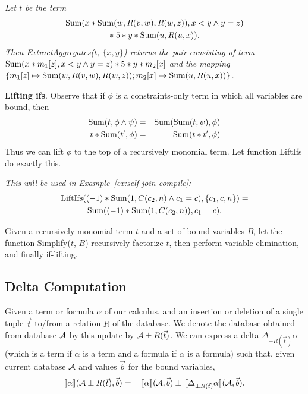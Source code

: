 \begin{example}\em
Let $t$ be the term
\begin{multline*}
\mbox{Sum}(x*\mbox{Sum}(w, R(v, w), R(w, z)), x<y \land y=z) \\
*\; 5 * y * \mbox{Sum}(u, R(u, x)).
\end{multline*}
Then ExtractAggregates($t$, $\{x,y\}$) returns the pair consisting of term
$\mbox{Sum}(x*m_1[z], x<y \land y=z) * 5 * y * m_2[x]$
and the mapping
$\{
m_1[z] \mapsto \mbox{Sum}(w, R(v, w), R(w, z));
m_2[x] \mapsto \mbox{Sum}(u, R(u, x))
\}$.
\punto
\end{example}


{\bf Lifting ifs}. Observe that if $\phi$ is a constraints-only term in which
all variables are bound, then
\begin{eqnarray*}
\mbox{Sum}(t, \phi \land \psi) &=& \mbox{Sum}(\mbox{Sum}(t, \psi), \phi) \\
t * \mbox{Sum}(t', \phi) &=& \mbox{Sum}(t * t', \phi)
\end{eqnarray*}
Thus we can lift $\phi$ to the top of a recursively monomial term.
Let function LiftIfs do exactly this.

\begin{example}\em
This will be used in Example~\ref{ex:self-join-compile}:
\begin{multline*}
\mbox{LiftIfs}((-1) * \mbox{Sum}(1, C(c_2, n) \land c_1=c), \{c_1, c, n\}) = \\
\mbox{Sum}((-1) * \mbox{Sum}(1, C(c_2, n)), c_1=c).
\end{multline*}
\end{example}


Given a recursively monomial term $t$ and a set of bound variables $B$,
let the function Simplify($t$, $B$) recursively factorize $t$, then perform
variable elimination, and finally if-lifting.


\subsection{Delta Computation}


\def\dt{\Delta_{\pm R(\vec{t})}}


Given a term or formula $\alpha$
of our calculus, and an insertion or deletion of a
single tuple $\vec{t}$ to/from a relation $R$ of the database.
We denote the database obtained from database $\db$ by this update by
$\db \pm R(\vec{t})$.
We can express a delta $\Delta_{\pm R(\vec{t})} \alpha$
(which is a term if $\alpha$ is a term and a formula if $\alpha$ is a formula)
such that,
given current database $\db$ and values $\vec{b}$ for the bound variables,
\begin{eqnarray}
\Bracks{\alpha}(\db \pm R(\vec{t}), \vec{b}) &=&
\,\Bracks{\alpha}(\db, \vec{b}) \pm \,\Bracks{\dt \alpha}(\db, \vec{b}).
\label{eq:delta}
\end{eqnarray}

